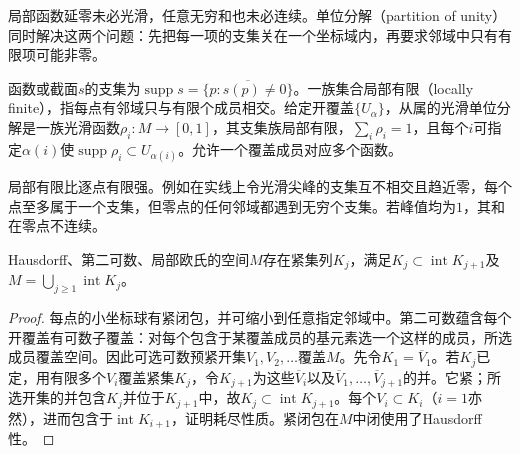 局部函数延零未必光滑，任意无穷和也未必连续。单位分解（partition of unity）同时解决这两个问题：先把每一项的支集关在一个坐标域内，再要求邻域中只有有限项可能非零。
\begin{definition}[支集、局部有限与从属]
函数或截面$s$的支集为$\operatorname{supp}s=\overline{\{p:s(p)\ne0\}}$。一族集合局部有限（locally finite），指每点有邻域只与有限个成员相交。给定开覆盖$\{U_\alpha\}$，从属的光滑单位分解是一族光滑函数$\rho_i:M\to[0,1]$，其支集族局部有限，$\sum_i\rho_i=1$，且每个$i$可指定$\alpha(i)$使$\operatorname{supp}\rho_i\subset U_{\alpha(i)}$。允许一个覆盖成员对应多个函数。
\end{definition}
局部有限比逐点有限强。例如在实线上令光滑尖峰的支集互不相交且趋近零，每个点至多属于一个支集，但零点的任何邻域都遇到无穷个支集。若峰值均为$1$，其和在零点不连续。

\begin{lemma}[可数紧耗尽]\label{lem:compact-exhaustion}
Hausdorff、第二可数、局部欧氏的空间$M$存在紧集列$K_j$，满足$K_j\subset\operatorname{int}K_{j+1}$及$M=\bigcup_{j\geq1}\operatorname{int}K_j$。
\end{lemma}
\begin{proof}
每点的小坐标球有紧闭包，并可缩小到任意指定邻域中。第二可数蕴含每个开覆盖有可数子覆盖：对每个包含于某覆盖成员的基元素选一个这样的成员，所选成员覆盖空间。因此可选可数预紧开集$V_1,V_2,\ldots$覆盖$M$。先令$K_1=\overline V_1$。若$K_j$已定，用有限多个$V_i$覆盖紧集$K_j$，令$K_{j+1}$为这些$\overline V_i$以及$\overline V_1,\ldots,\overline V_{j+1}$的并。它紧；所选开集的并包含$K_j$并位于$K_{j+1}$中，故$K_j\subset\operatorname{int}K_{j+1}$。每个$V_i\subset K_i$（$i=1$亦然），进而包含于$\operatorname{int}K_{i+1}$，证明耗尽性质。紧闭包在$M$中闭使用了Hausdorff性。
\end{proof}

